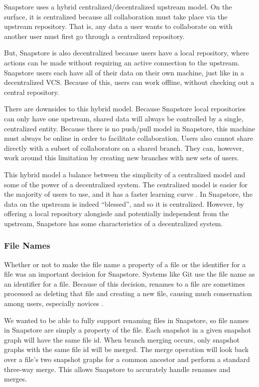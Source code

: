 Snapstore uses a hybrid centralized/decentralized upstream model. On the surface, it is centralized because all collaboration must take place via the upstream repository. That is, any data a user wants to collaborate on with another user must first go through a centralized repository.

But, Snapstore is also decentralized because users have a local repository, where actions can be made without requiring an active connection to the upstream. Snapstore users each have all of their data on their own machine, just like in a decentralized VCS. Because of this, users can work offline, without checking out a central repository.

There are downsides to this hybrid model. Because Snapstore local repositories can only have one upstream, shared data will always be controlled by a single, centralized entity. Because there is no push/pull model in Snapstore, this machine must always be online in order to facilitate collaboration. Users also cannot share directly with a subset of collaborators on a shared branch. They can, however, work around this limitation by creating new branches with new sets of users.

This hybrid model a balance between the simplicity of a centralized model and some of the power of a decentralized system. The centralized model is easier for the majority of users to use, and it has a faster learning curve \cite{Brindescu}. In Snapstore, the data on the upstream is indeed ``blessed'', and so it is centralized. However, by offering a local repository alongisde and potentially independent from the upstream, Snapstore has some characteristics of a decentralized system.

\subsubsection{File Names}

Whether or not to make the file name a property of a file or the identifier for a file was an important decision for Snapstore. Systems like Git use the file name as an identifier for a file. Because of this decision, renames to a file are sometimes processed as deleting that file and creating a new file, causing much consernation among users, especially novices \cite{RossoJackson}.

We wanted to be able to fully support renaming files in Snapstore, so file names in Snapstore are simply a property of the file. Each snapshot in a given snapshot graph will have the same file id. When branch merging occurs, only snapshot graphs with the same file id will be merged. The merge operation will look back over a file's two snapshot graphs for a common ancestor and perform a standard three-way merge. This allows Snapstore to accurately handle renames and merges.



